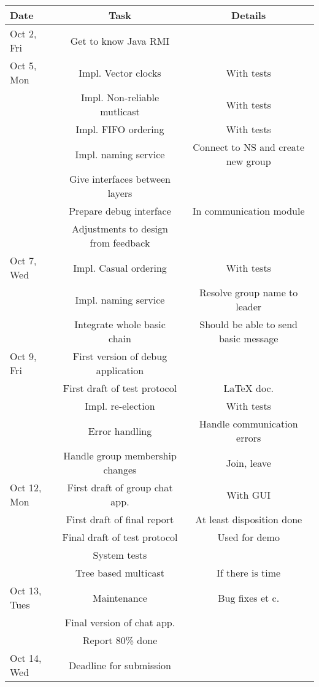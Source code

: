 		
		\hspace*{-1.5cm}\begin{tabular}{l|cc}
			\textbf{Date} & \textbf{Task} & \textbf{Details} \\
			\hline
			Oct 2, Fri & Get to know Java RMI \\
			\hline
			Oct 5, Mon & Impl. Vector clocks & With tests \\
			& Impl. Non-reliable mutlicast & With tests \\
			& Impl. FIFO ordering & With tests \\
			& Impl. naming service & Connect to NS and create new group \\
			& Give interfaces between layers &  \\
			& Prepare debug interface & In communication module \\
			& Adjustments to design from feedback & \\
			\hline
			Oct 7, Wed & Impl. Casual ordering & With tests \\
			& Impl. naming service & Resolve group name to leader \\
			& Integrate whole basic chain & Should be able to send basic message \\
			\hline
			Oct 9, Fri & First version of debug application &  \\
			& First draft of test protocol & LaTeX doc. \\
			& Impl. re-election & With tests \\
			& Error handling & Handle communication errors \\
			& Handle group membership changes & Join, leave \\
			\hline
			Oct 12, Mon & First draft of group chat app. & With GUI \\
			& First draft of final report & At least disposition done \\
			& Final draft of test protocol & Used for demo \\
			& System tests & \\
			& Tree based multicast & If there is time \\
			\hline
			Oct 13, Tues & Maintenance & Bug fixes et c.\\
			& Final version of chat app. & \\
			& Report 80\% done & \\
			\hline
			Oct 14, Wed & Deadline for submission & \\

		\end{tabular}

